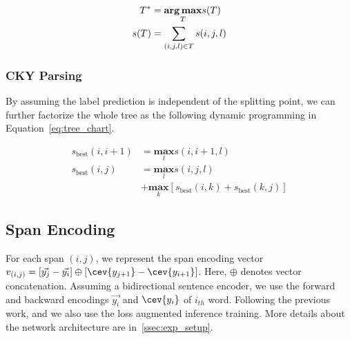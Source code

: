 \begin{equation}
  \label{eq:tree_factorize}
 \begin{aligned} T^{*}  & = \underset{T}{\textbf{arg\,max}} s(T)     \\ s(T)
                        & = \sum_{(i,j,l) \in T} s(i,j,l)
\end{aligned}
\end{equation}

\subsubsection{CKY Parsing}
\label{sssec:phr:cky-parsing}
By assuming the label prediction is independent of the splitting
point, we can further factorize the whole tree as the following
dynamic programming in Equation~\ref{eq:tree_chart}.

\begin{equation}
  \label{eq:tree_chart}
\begin{aligned}
      s_{\text{best}}(i, i+1) & = \underset{l}{\textbf{max}} s(i,i+1, l) \\
      s_{\text{best}}(i, j) & = \underset{l}{\textbf{max}} s(i,j, l)
      \\ & + \underset{k}{\textbf{max}}[ s_{\text{best}}(i,k) +
      s_{\text{best}}(k,j) ]
\end{aligned}
\end{equation}

\subsection{Span Encoding}
\label{ssec:phr:span}

For each span $(i,j)$, we represent the span encoding vector
$v_{(i,j)} = [\vec{y_{j}} - \vec{y_{i}}] \oplus [\cev{y_{j+1}} -
\cev{y_{i+1}}] $. Here, $\oplus$ denotes vector concatenation. Assuming a
bidirectional sentence encoder, we use the forward and backward
encodings $\vec{y_{i}}$ and $\cev{y_{i}}$ of $i_{th}$ word. Following
the previous work, and we also use the loss augmented inference
training. More details about the network
architecture are in~\autoref{ssec:exp_setup}.


